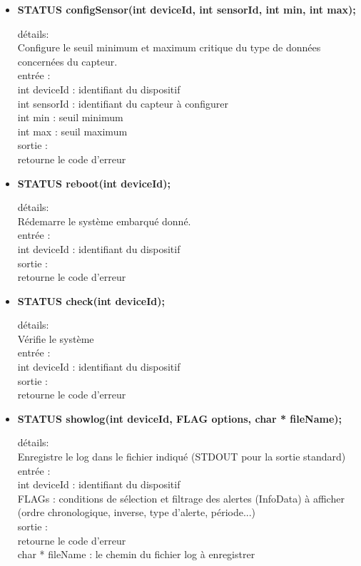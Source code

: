 \begin{itemize}
\item \textbf{STATUS configSensor(int deviceId, int sensorId, int min, int max);}
\begin{tabbing}
détails: \=\\
\>		Configure le seuil minimum et maximum critique du type de données concernées du capteur. \\
entrée : \\
\>		int deviceId : identifiant du dispositif \\
\>		int sensorId : identifiant du capteur à configurer \\
\>		int min : seuil minimum \\
\>		int max : seuil maximum \\
sortie : \\
\>		retourne le code d'erreur \\
\end{tabbing}

\item \textbf{STATUS reboot(int deviceId);}
\begin{tabbing}
détails: \=\\
\>		Rédemarre le système embarqué donné. \\
entrée : \\
\>		int deviceId : identifiant du dispositif \\ 
sortie : \\
\>		retourne le code d'erreur \\
\end{tabbing}

\item \textbf{STATUS check(int deviceId);}
\begin{tabbing}
détails: \=\\
\>		Vérifie le système \\
entrée : \\
\>		int deviceId : identifiant du dispositif \\
sortie : \\
\>		retourne le code d'erreur \\
\end{tabbing}

\item \textbf{STATUS showlog(int deviceId, FLAG options, char * fileName);}
\begin{tabbing}
détails: \=\\
\>		Enregistre le log dans le fichier indiqué (STDOUT pour la sortie standard) \\
entrée : \\
\>		int deviceId : identifiant du dispositif \\
\>		FLAGs : conditions de sélection et filtrage des alertes (InfoData) à afficher (ordre chronologique, inverse, type d'alerte, période...) \\
sortie : \\
\>		retourne le code d'erreur \\
\>		char * fileName : le chemin du fichier log à enregistrer \\
\end{tabbing}


\end{itemize}
